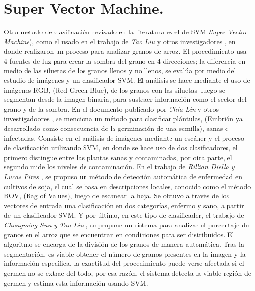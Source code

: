 \section{Super Vector Machine.}
	Otro método de clasificación revisado en la literatura es el de SVM \textit{Super Vector Machine}), como el usado en el trabajo de \textit{Tao Liu} y otros investigadores \cite{LIU201679}, en donde realizaron un proceso para analizar granos de arroz. El procedimiento usa 4 fuentes de luz para crear la sombra del grano en 4 direcciones; la diferencia en medio de las siluetas de los granos llenos y no llenos, se evalúa por medio del estudio de imágenes y un clasificador SVM. El análisis se hace mediante el uso de imágenes RGB, (Red-Green-Blue), de los granos con las siluetas, luego se segmentan desde la imagen binaria, para sustraer información como el sector del grano y de la sombra. En el documento publicado por \textit{Chia-Lin}  y otros investigadoores \cite{CHUNG2016404}, se menciona un método para clasificar plántulas, (Embrión ya desarrollado como consecuencia de la germinación de una semilla), sanas e infectadas. Consiste en el análisis de imágenes mediante un escáner y el proceso de clasificación utilizando SVM, en donde se hace uso de dos clasificadores, el primero distingue entre las plantas sanas y contaminadas, por otra parte, el segundo mide los niveles de contaminación. En el trabajo de \textit{Rillian Diello y Lucas Pires} \cite{PIRES201648}, se propuso un método de detección automática de enfermedad en cultivos de soja, el cual se basa en descripciones locales, conocido como el método BOV, (Bag of Values), luego de escanear la hoja. Se obtuvo a través de los vectores de entrada una clasificación en dos categorías, enfermo y sano, a partir de un clasificador SVM. Y por último, en este tipo de clasificador, el trabajo de \textit{Chengming Sun y Tao Liu} \cite{SUN2014426}, se propone un sistema para analizar el porcentaje de granos en el arroz que se encuentran en condiciones para ser distribuidos. El algoritmo se encarga de la división de los granos de manera automática. Tras la segmentación, es viable obtener el número de granos presentes en la imagen y la información específica, la exactitud del procedimiento puede verse afectada si el germen no se extrae del todo, por esa razón, el sistema detecta la viable región de germen y estima esta información usando SVM.\\


